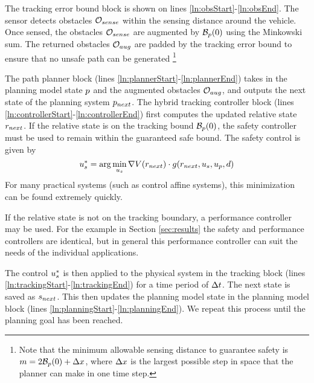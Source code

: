 The tracking error bound block is shown on lines \ref{ln:obsStart}-\ref{ln:obsEnd}. The sensor detects obstacles $\mathcal{O}_{sense}$ within the sensing distance around the vehicle. Once sensed, the obstacles $\mathcal{O}_{sense}$ are augmented by $\mathcal B_p(0)$ using the Minkowski sum. The returned obstacles $\mathcal{O}_{aug}$ are padded by the tracking error bound to ensure that no unsafe path can be generated \footnote{Note that the minimum allowable sensing distance to guarantee safety is $m = 2\mathcal B_p(0) + \Delta x$, where $\Delta x$ is the largest possible step in space that the planner can make in one time step.}


 The path planner block (lines \ref{ln:plannerStart}-\ref{ln:plannerEnd}) takes in the planning model state $p$ and the augmented obstacles $\mathcal{O}_{aug}$, and outputs the next state of the planning system $p_{next}$. The hybrid tracking controller block (lines \ref{ln:controllerStart}-\ref{ln:controllerEnd}) first computes the updated relative state $r_{next}$. If the relative state is on the tracking bound $\mathcal B_p(0)$, the safety controller must be used to remain within the guaranteed safe bound. The safety control is given by
\begin{equation}
	u_s^* = \arg\min_{u_s} \nabla V(r_{next}) \cdot g(r_{next},u_s,u_p,d)
\end{equation}
For many practical systems (such as control affine systems), this minimization can be found extremely quickly.

If the relative state is not on the tracking boundary, a performance controller may be used. For the example in Section \ref{sec:results} the safety and performance controllers are identical, but in general this performance controller can suit the needs of the individual applications.

The control $u_s^*$ is then applied to the physical system in the tracking block (lines \ref{ln:trackingStart}-\ref{ln:trackingEnd}) for a time period of $\Delta t$. The next state is saved as $s_{next}$. This then updates the planning model state in the planning model block (lines \ref{ln:planningStart}-\ref{ln:planningEnd}). We repeat this process until the planning goal has been reached.
